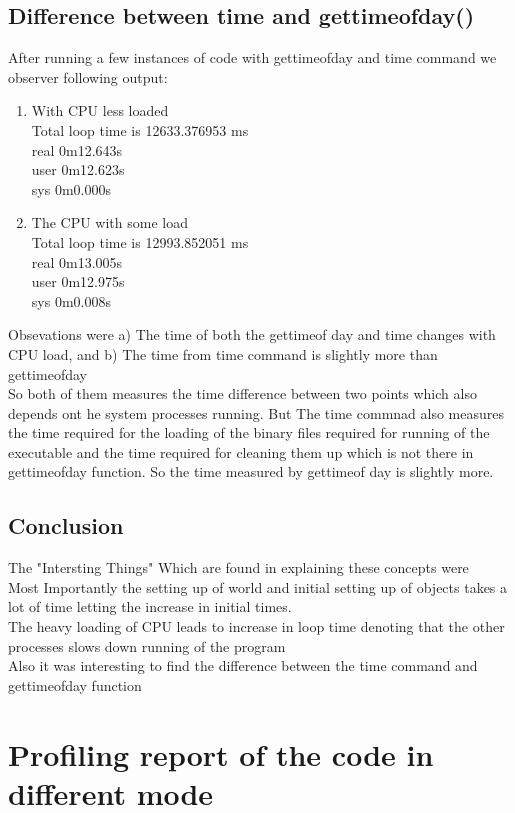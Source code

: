 \documentclass[11pt,]{article}
\begin{document}
\begin{singlespace}
\subsection{Difference between time and gettimeofday()}
After running a few instances of code with gettimeofday and time command we observer following output:
\begin{enumerate}
    \item With CPU less loaded\\
		Total loop time is 12633.376953 ms\\
		real	0m12.643s\\
		user	0m12.623s\\
		sys	0m0.000s
    \item The CPU with some load\\
		Total loop time is 12993.852051 ms\\
		real	0m13.005s\\
		user	0m12.975s\\
		sys	0m0.008s
\end{enumerate}
Obsevations were a) The time of both the gettimeof day and time changes with CPU load, and b) The time from time command is slightly more than
gettimeofday \\

So both of them measures the time difference between two points which also depends ont he system processes running. But The time commnad also measures 
the time required for the loading of the binary files required for running of the executable and the time required for cleaning them up which is 
not there in gettimeofday function. So the time measured by gettimeof day is slightly more.



\subsection{Conclusion}
The "Intersting Things" Which are found in explaining these concepts were \\
Most Importantly the setting up of world and initial setting up of objects takes a lot of time letting the increase in initial times.\\
The heavy loading of CPU leads to increase in loop time denoting that the other processes slows down running of the program\\
Also it was interesting to find the difference between the time command and gettimeofday function
	
\newpage
\section{Profiling report of the code in different mode}

\end{singlespace}
\end{document}
